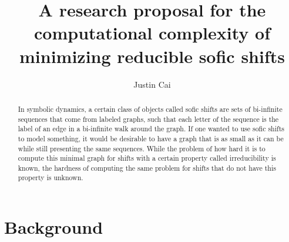 \documentclass{article}
\title{
\vspace{-2.5cm}
A research proposal for the computational complexity of
minimizing reducible sofic shifts
}
\author{Justin Cai}
\newcommand{\Ac}{\mathcal{A}}  %
\newcommand{\Fc}{\mathcal{F}}
\newcommand{\shift}[1]{\mathsf{X}_{#1}}
\newcommand{\term}[1]{\textit{#1}}
\begin{document}
\maketitle

\begin{abstract}
    In symbolic dynamics, a certain class of objects 
    called sofic shifts are sets of bi-infinite
    sequences that come from labeled graphs, such that each letter of 
    the sequence is the label of an edge in a bi-infinite walk around the graph.
    If one wanted to use sofic shifts to model something, it would be desirable to 
    have a graph that is as small as it can be while still presenting the same sequences.
    While the problem of how hard it is to compute this minimal graph for shifts with a 
    certain property called irreducibility is known, the hardness of computing the same
    problem for shifts that do not have this property is unknown.
\end{abstract}

\section{Background}



\end{document}
